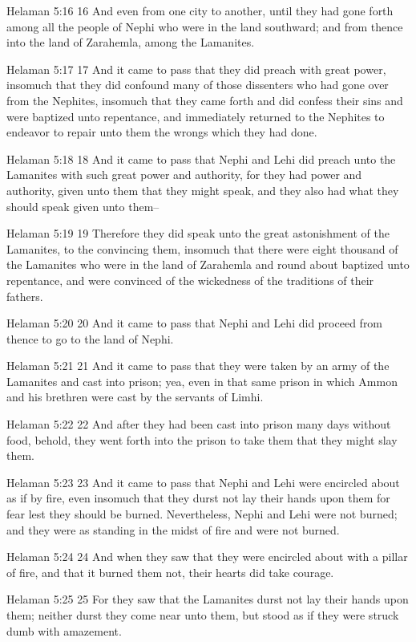 Helaman 5:16
 16 And even from one city to another, until they had gone forth
among all the people of Nephi who were in the land southward; and
from thence into the land of Zarahemla, among the Lamanites.

Helaman 5:17
 17 And it came to pass that they did preach with great power,
insomuch that they did confound many of those dissenters who had
gone over from the Nephites, insomuch that they came forth and
did confess their sins and were baptized unto repentance, and
immediately returned to the Nephites to endeavor to repair unto
them the wrongs which they had done.

Helaman 5:18
 18 And it came to pass that Nephi and Lehi did preach unto the
Lamanites with such great power and authority, for they had power
and authority, given unto them that they might speak, and they
also had what they should speak given unto them--

Helaman 5:19
 19 Therefore they did speak unto the great astonishment of the
Lamanites, to the convincing them, insomuch that there were eight
thousand of the Lamanites who were in the land of Zarahemla and
round about baptized unto repentance, and were convinced of the
wickedness of the traditions of their fathers.

Helaman 5:20
 20 And it came to pass that Nephi and Lehi did proceed from
thence to go to the land of Nephi.

Helaman 5:21
 21 And it came to pass that they were taken by an army of the
Lamanites and cast into prison; yea, even in that same prison in
which Ammon and his brethren were cast by the servants of Limhi.

Helaman 5:22
 22 And after they had been cast into prison many days without
food, behold, they went forth into the prison to take them that
they might slay them.

Helaman 5:23
 23 And it came to pass that Nephi and Lehi were encircled about
as if by fire, even insomuch that they durst not lay their hands
upon them for fear lest they should be burned. Nevertheless,
Nephi and Lehi were not burned; and they were as standing in the
midst of fire and were not burned.

Helaman 5:24
 24 And when they saw that they were encircled about with a
pillar of fire, and that it burned them not, their hearts did
take courage.

Helaman 5:25
 25 For they saw that the Lamanites durst not lay their hands
upon them; neither durst they come near unto them, but stood as
if they were struck dumb with amazement.

